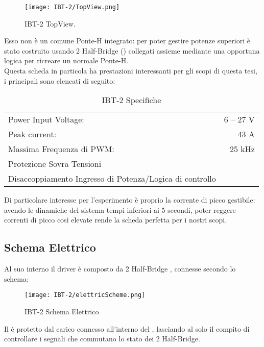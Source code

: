 \begin{figure}[H]
	\centering
	\caption[Driver Motori IBT-2 TopView \& PinOut]{IBT-2 TopView.}
	\texttt{[image: IBT-2/TopView.png]}
\end{figure}

\noindent
Esso non è un comune Ponte-H integrato: per poter gestire potenze superiori è stato costruito usando 2 Half-Bridge (\cite{BTS7960b}) collegati assieme mediante una opportuna logica per ricreare un normale Ponte-H.\\
Questa scheda in particola ha prestazioni interessanti per gli scopi di questa tesi, i principali sono elencati di seguito:\vspace{-8mm}
\begin{table}[H]
	\centering
	\caption[IBT-2 Specifiche]{IBT-2 Specifiche}
	\begin{tabular}[t]{|l r|}
		\hline
		Power Input Voltage:                                     & 6 -- 27 V \\
		Peak current:                                            & 43 A      \\
		Massima Frequenza di PWM:                                & 25 kHz    \\
		Protezione Sovra Tensioni                                &           \\
		Disaccoppiamento Ingresso di Potenza/Logica di controllo &           \\
		\hline
	\end{tabular}
\end{table}\vspace{-4mm}
\noindent
Di particolare interesse per l'esperimento è proprio la corrente di picco gestibile:
avendo le dinamiche del sistema tempi inferiori ai 5 secondi, poter reggere correnti di picco così elevate rende
la scheda perfetta per i nostri scopi.

\newpage
\subsection{Schema Elettrico}
Al suo interno il driver è composto da 2 Half-Bridge \cite{BTS7960b}, connesse secondo lo schema:
\begin{figure}[H]
	\centering
	\caption[IBT-2 Schema Elettrico]{IBT-2 Schema Elettrico}
	\texttt{[image: IBT-2/elettricScheme.png]}
\end{figure}\vspace{-5mm}

\noindent
Il \microC è protetto dal carico connesso all'interno del , lasciando al \microC solo il compito di controllare i segnali che commutano lo stato dei 2 Half-Bridge.
\newpage
